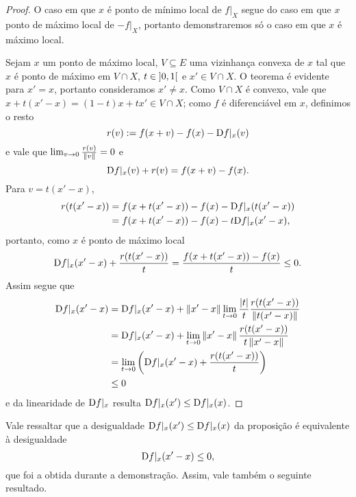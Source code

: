 \begin{proof}
O caso em que $x$ é ponto de mínimo local de $f|_X$ segue do caso em que $x$ ponto de máximo local de $-f|_X$, portanto demonstraremos  só o caso em que $x$ é máximo local.

Sejam $x$ um ponto de máximo local, $V \subseteq E$ uma vizinhança convexa de $x$ tal que $x$ é ponto de máximo em $V \cap X$, $t \in \left]0,\allowbreak 1\right[$ e $x' \in V \cap X$. O teorema é evidente para $x'=x$, portanto consideramos $x' \neq x$. Como $V \cap X$ é convexo, vale que $x + t(x'-x) = (1-t)x + tx' \in V \cap X$; como $f$ é diferenciável em $x$, definimos o resto
	\begin{equation*}
	r(v) := f(x + v) - f(x) - \mathrm{D} f|_x(v)
	\end{equation*}
e vale que $\lim_{v \to 0} \frac{r(v)}{\left\Vert{v}\right\Vert} = 0$ e
	\begin{equation*}
	\mathrm{D} f|_x(v) + r(v) = f(x+v) - f(x).
	\end{equation*}
Para $v=t(x'-x)$,
	\begin{align*}
	r(t(x'-x)) &= f(x + t(x'-x)) - f(x) - \mathrm{D} f|_x(t(x'-x)) \\
		&= f(x + t(x'-x)) - f(x) - t\mathrm{D} f|_x(x'-x),
	\end{align*}
portanto, como $x$ é ponto de máximo local
	\begin{equation*}
	\mathrm{D} f|_x(x'-x) + \frac{r(t(x'-x))}{t} = \frac{f(x + t(x'-x)) - f(x)}{t} \leq 0.
	\end{equation*}
Assim segue que
	\begin{align*}
	\mathrm{D} f|_x(x'-x) &= \mathrm{D} f|_x(x'-x) + \left\Vert{x'-x}\right\Vert\lim_{t \to 0} \frac{\left\vert{t}\right\vert}{t}\frac{r(t(x'-x))}{\left\Vert{t(x'-x)}\right\Vert} \\
		&= \mathrm{D} f|_x(x'-x) + \lim_{t \to 0} \left\Vert{x'-x}\right\Vert\frac{r(t(x'-x))}{t\left\Vert{x'-x}\right\Vert} \\
		&= \lim_{t \to 0} \left( \mathrm{D} f|_x(x'-x) + \frac{r(t(x'-x))}{t} \right) \\
		&\leq 0
	\end{align*}
e da linearidade de $\mathrm{D} f|_x$ resulta $\mathrm{D} f|_x(x') \leq \mathrm{D} f|_x(x)$.
\end{proof}

Vale ressaltar que a desigualdade $\mathrm{D} f|_x(x') \leq \mathrm{D} f|_x(x)$ da proposição é equivalente à desigualdade
	\begin{equation*}
	\mathrm{D} f|_x(x'-x) \leq 0,
	\end{equation*}
que foi a obtida durante a demonstração. Assim, vale também o seguinte resultado.

